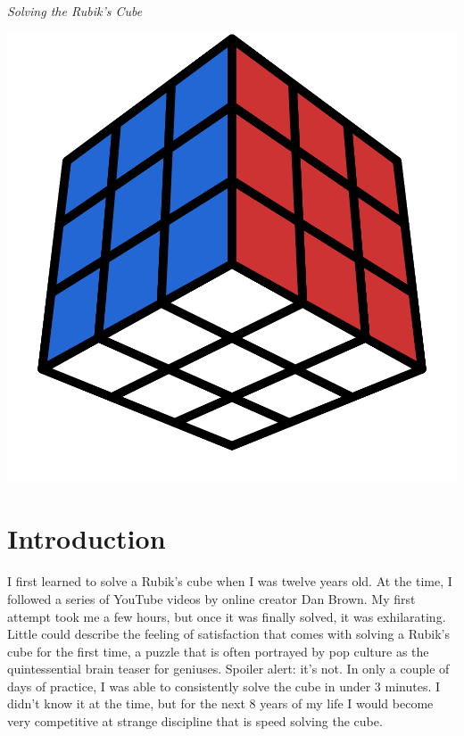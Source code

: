 \documentclass[12pt,letterpaper]{article}
\begin{document}
\thispagestyle{empty}

\vspace*{\fill}

\begin{center}
    {\textit{\Huge Solving the Rubik's Cube}}

    \hfill

    \includegraphics[scale=0.3]{cover}

    \hfill

    {}
\end{center}

\vspace*{\fill}

\newpage

\tableofcontents

\newpage



\section{Introduction}
I first learned to solve a Rubik's cube when I was twelve years old. At the
time, I followed a series of YouTube videos by online creator Dan Brown. My
first attempt took me a few hours, but once it was finally solved, it was
exhilarating. Little could describe the feeling of satisfaction that comes with
solving a Rubik's cube for the first time, a puzzle that is often portrayed by
pop culture as the quintessential brain teaser for geniuses. Spoiler alert: it's
not. In only a couple of days of practice, I was able to consistently solve the
cube in under 3 minutes. I didn't know it at the time, but for the next 8 years
of my life I would become very competitive at strange discipline that is speed
solving the cube.
\end{document}
